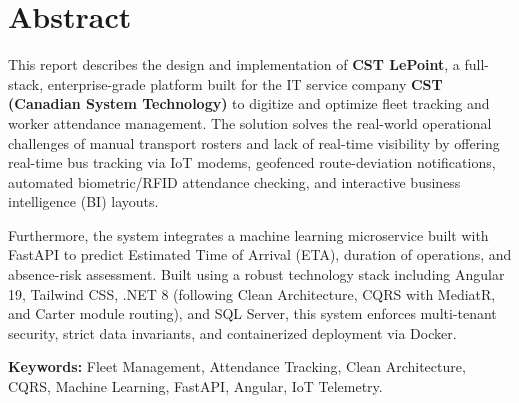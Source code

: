 \chapter*{Abstract}

This report describes the design and implementation of \textbf{CST LePoint}, a full-stack, enterprise-grade platform built for the IT service company \textbf{CST (Canadian System Technology)} to digitize and optimize fleet tracking and worker attendance management. The solution solves the real-world operational challenges of manual transport rosters and lack of real-time visibility by offering real-time bus tracking via IoT modems, geofenced route-deviation notifications, automated biometric/RFID attendance checking, and interactive business intelligence (BI) layouts.

Furthermore, the system integrates a machine learning microservice built with FastAPI to predict Estimated Time of Arrival (ETA), duration of operations, and absence-risk assessment. Built using a robust technology stack including Angular 19, Tailwind CSS, .NET 8 (following Clean Architecture, CQRS with MediatR, and Carter module routing), and SQL Server, this system enforces multi-tenant security, strict data invariants, and containerized deployment via Docker.

\vspace{1.5cm}
\noindent\textbf{Keywords:} Fleet Management, Attendance Tracking, Clean Architecture, CQRS, Machine Learning, FastAPI, Angular, IoT Telemetry.
